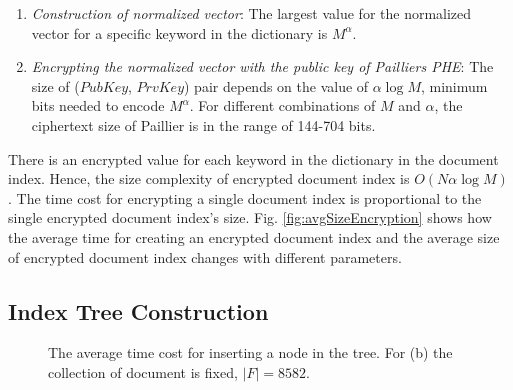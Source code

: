 \documentclass[sigconf,pdftex]{acmart}
\begin{document}
\begin{enumerate}
    \item \textit{Construction of normalized vector}: The largest value for the normalized vector for a specific keyword in the dictionary is $M^\alpha$.
    
    \item \textit{Encrypting the normalized vector with the public key of Pailliers PHE}: The size of ($PubKey$, $PrvKey$) pair depends on the value of $\alpha \log{M}$, minimum bits needed to encode $M^\alpha$. For different combinations of $M$ and $\alpha$, the ciphertext size of Paillier is in the range of 144-704 bits.
\end{enumerate}

There is an encrypted value for each keyword in the dictionary in the document index. Hence, the size complexity of encrypted document index is $O(N \alpha \log{M})$. The time cost for encrypting a single document index is proportional to the single encrypted document index's size. Fig. \ref{fig:avgSizeEncryption} shows how the average time for creating an encrypted document index and the average size of encrypted document index changes with different parameters.





\subsection{Index Tree Construction}


\begin{figure}[htpb]
    
        \hfill
        
        
        
  \caption{\small{The average time cost for inserting a node in the tree. For (b) the collection of document is fixed, $|F|= 8582$.}}
  \label{fig:tree-insert} 
\end{figure}
\end{document}
